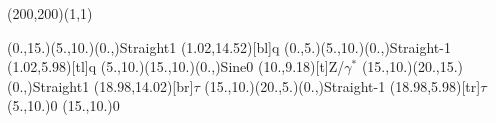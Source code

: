 \documentclass[12pt]{article}
\begin{document}
 
 \thispagestyle{empty}
	
 \begin{feynartspicture}(200,200)(1,1) 
 \FADiagram{} 

\FAProp(0.,15.)(5.,10.)(0.,){Straight}{1}
\FALabel(1.02,14.52)[bl]{q}
\FAProp(0.,5.)(5.,10.)(0.,){Straight}{-1}
\FALabel(1.02,5.98)[tl]{q}
\FAProp(5.,10.)(15.,10.)(0.,){Sine}{0}
\FALabel(10.,9.18)[t]{Z/$\gamma^*$}
\FAProp(15.,10.)(20.,15.)(0.,){Straight}{1}
\FALabel(18.98,14.02)[br]{$\tau$}
\FAProp(15.,10.)(20.,5.)(0.,){Straight}{-1}
\FALabel(18.98,5.98)[tr]{$\tau$}
\FAVert(5.,10.){0}
\FAVert(15.,10.){0}

 
 \end{feynartspicture} 
 
\end{document}
